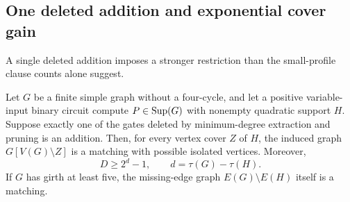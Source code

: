 \subsection{One deleted addition and exponential cover gain}
A single deleted addition imposes a stronger restriction than the small-profile clause counts alone suggest.

\begin{theorem}\label{thm:purecut}
Let $G$ be a finite simple graph without a four-cycle, and let a positive variable-input binary circuit compute $P\in\operatorname{Sup}(G)$ with nonempty quadratic support $H$. Suppose exactly one of the gates deleted by minimum-degree extraction and pruning is an addition. Then, for every vertex cover $Z$ of $H$, the induced graph $G[V(G)\setminus Z]$ is a matching with possible isolated vertices. Moreover,
\[
 D\ge 2^d-1,\qquad d=\tau(G)-\tau(H).
\]
If $G$ has girth at least five, the missing-edge graph $E(G)\setminus E(H)$ itself is a matching.
\end{theorem}
